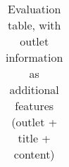 \begin{table}[htbp]
\begin{tabular}{| c | c | c | c | c |}
    \end{tabular}
    \caption{Evaluation table, with outlet information as additional features (outlet + title + content)}
    \label{table:eval-outlet}
\end{table}

